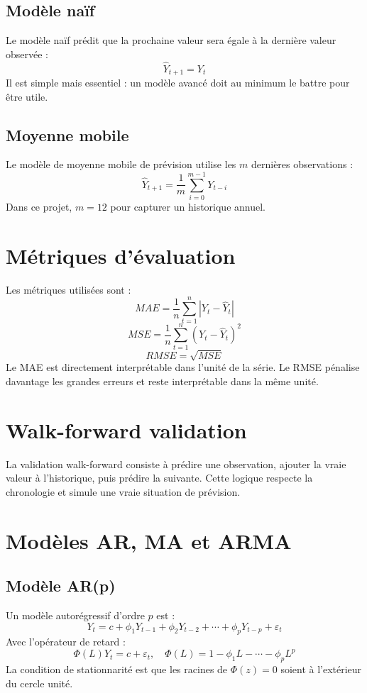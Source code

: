 \documentclass[12pt,a4paper]{report}
\begin{document}
\subsection{Modèle naïf}
Le modèle naïf prédit que la prochaine valeur sera égale à la dernière valeur observée :
\[
\hat{Y}_{t+1} = Y_t
\]
Il est simple mais essentiel : un modèle avancé doit au minimum le battre pour être utile.

\subsection{Moyenne mobile}
Le modèle de moyenne mobile de prévision utilise les $m$ dernières observations :
\[
\hat{Y}_{t+1} = \frac{1}{m}\sum_{i=0}^{m-1}Y_{t-i}
\]
Dans ce projet, $m=12$ pour capturer un historique annuel.

\section{Métriques d'évaluation}
Les métriques utilisées sont :
\[
MAE = \frac{1}{n}\sum_{t=1}^n |Y_t - \hat{Y}_t|
\]
\[
MSE = \frac{1}{n}\sum_{t=1}^n (Y_t - \hat{Y}_t)^2
\]
\[
RMSE = \sqrt{MSE}
\]
Le MAE est directement interprétable dans l'unité de la série. Le RMSE pénalise davantage les grandes erreurs et reste interprétable dans la même unité.

\section{Walk-forward validation}
La validation walk-forward consiste à prédire une observation, ajouter la vraie valeur à l'historique, puis prédire la suivante. Cette logique respecte la chronologie et simule une vraie situation de prévision.

\section{Modèles AR, MA et ARMA}
\subsection{Modèle AR(p)}
Un modèle autorégressif d'ordre $p$ est :
\[
Y_t = c + \phi_1Y_{t-1} + \phi_2Y_{t-2} + \cdots + \phi_pY_{t-p} + \varepsilon_t
\]
Avec l'opérateur de retard :
\[
\Phi(L)Y_t = c + \varepsilon_t, \quad \Phi(L)=1-\phi_1L-\cdots-\phi_pL^p
\]
La condition de stationnarité est que les racines de $\Phi(z)=0$ soient à l'extérieur du cercle unité.
\end{document}
